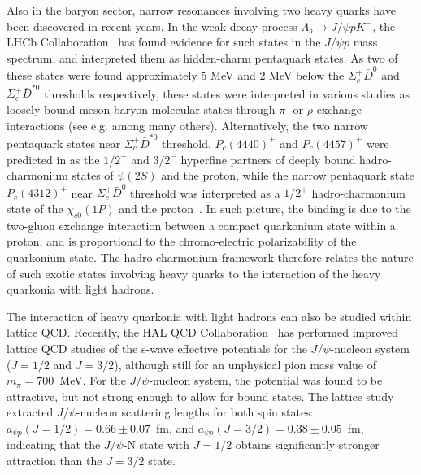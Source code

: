 \documentclass[prd,amsmath,twocolumn,floatfix,amssymb, preprintnumbers, linenumbers,nofootinbib, superscriptaddress]{revtex4}
\begin{document}
Also in the baryon sector, narrow resonances involving two heavy quarks have been discovered in recent years. In the weak decay process
$\Lambda_b \to J/\psi p K^-$, the LHCb Collaboration~\cite{Aaij:2015tga, Aaij:2019vzc} 
has found evidence for such states in the  $J/\psi p$ mass spectrum, and interpreted them as hidden-charm pentaquark states. 
As two of these states were found approximately 5 MeV and 2 MeV below the $\Sigma_c^+ \bar D^0$ and $\Sigma_c^+ \bar D^{\ast 0}$ thresholds respectively, these states were interpreted in various studies as loosely bound meson-baryon molecular states through $\pi$- or $\rho$-exchange interactions (see e.g. \cite{Roca:2015dva} among many others).  
Alternatively, the two narrow pentaquark states near $\Sigma_c^+ \bar D^{\ast 0}$ threshold, $P_c(4440)^+$ and $P_c(4457)^+$ were predicted in \cite{Eides:2015dtr} as the $1/2^-$ and $3/2^-$ hyperfine partners of deeply bound hadro-charmonium states of $\psi(2S)$ and the proton, while the narrow pentaquark state $P_c(4312)^+$ near $\Sigma_c^+ \bar D^0$ threshold was interpreted as a $1/2^+$ hadro-charmonium state of the $\chi_{c0}(1P)$ and the proton~\cite{Eides:2019tgv}. In such picture, the binding is due to the two-gluon exchange interaction between a compact quarkonium state within a proton, and is proportional to the chromo-electric polarizability of the quarkonium state. 
The hadro-charmonium framework therefore relates the nature of such exotic states involving heavy quarks to the interaction of the heavy quarkonia with light hadrons. 

The interaction of heavy quarkonia with light hadrons can also be studied within lattice QCD. 
Recently, the HAL QCD Collaboration~\cite{Sugiura:2019pye}  has performed improved lattice QCD studies of the s-wave effective potentials for 
the  $J/\psi$-nucleon system ($J = 1/2$ and $J = 3/2$), although still for an unphysical pion mass value of $m_\pi = 700$~MeV. For the $J/\psi$-nucleon system, the potential was found to be attractive, but not strong enough to allow for bound states. The lattice study extracted $J/\psi$-nucleon scattering lengths for both spin states: 
$a_{\psi p}(J = 1/2) = 0.66 \pm 0.07$~fm, and 
$a_{\psi p}(J = 3/2) = 0.38 \pm 0.05$~fm, indicating that the $J/\psi$-N state with 
$J = 1/2$  obtains significantly stronger attraction than the $J = 3/2$ state. 
\end{document}
